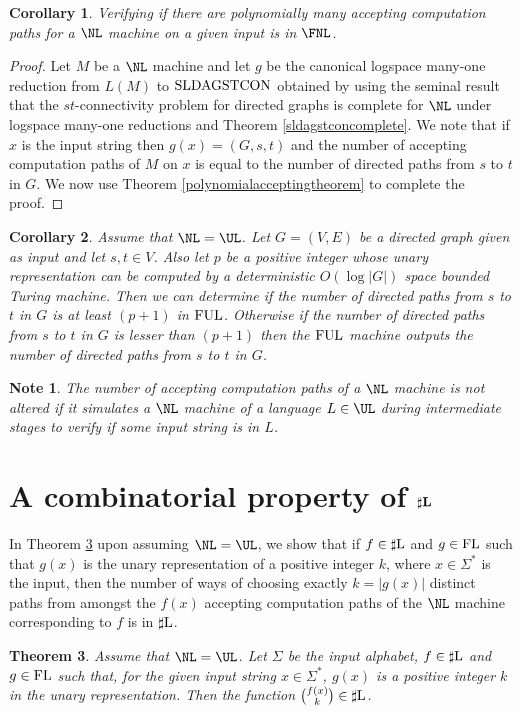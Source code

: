 \documentclass{amsbook}
\newtheorem{theorem}{Theorem}[chapter]
\newtheorem{corollary}[theorem]{Corollary}
\newtheorem{note}[notenum]{Note}
\theoremstyle{definition}
\theoremstyle{remark}
\numberwithin{section}{chapter}
\numberwithin{equation}{chapter}
\newcommand{\sharpL}{\mbox{$\sharp$\rm L}}
\newcommand{\boldsharpL}{\mbox{$\textrm{\bf $\mathbf{\sharp}$}$\rm \bf L}}
\newcommand{\FL}{\mbox{\rm FL}}
\newcommand{\LDAGSTCON}{\mbox{\rm SLDAGSTCON}}
\newcommand{\FUL}{\mbox{\rm FUL}}
\begin{document}
\begin{corollary}
Verifying if there are polynomially many accepting computation paths for a $\NL$ machine on a given input is in $\FNL$.
\end{corollary}
\begin{proof}
Let $M$ be a $\NL$ machine and let $g$ be the canonical logspace many-one reduction from $L(M)$ to $\LDAGSTCON$ obtained by using the seminal result that the $st$-connectivity problem for directed graphs is complete for $\NL$ under logspace many-one reductions and Theorem \ref{sldagstconcomplete}. We note that if $x$ is the input string then $g(x)=(G,s,t)$ and the number of accepting computation paths of $M$ on $x$ is equal to the number of directed paths from $s$ to $t$ in $G$. We now use Theorem \ref{polynomialacceptingtheorem} to complete the proof.
\end{proof}

\begin{corollary}\label{ldag-st-subgraph-ul}
Assume that $\NL =\UL$. Let $G=(V,E)$ be a directed graph given as input and let $s,t\in V$. Also let $p$ be a positive integer whose unary representation can be computed by a deterministic $O(\log |G|)$ space bounded Turing machine. Then we can determine if the number of directed paths from $s$ to $t$ in $G$ is at least $(p+1)$ in $\FUL$. Otherwise if the number of directed paths from $s$ to $t$ in $G$ is lesser than $(p+1)$ then the $\FUL$ machine outputs the number of directed paths from $s$ to $t$ in $G$.
\end{corollary}
\begin{note}\label{st-subgraph}
The number of accepting computation paths of a $\NL$ machine is not altered if it simulates a $\NL$ machine of a language $L\in \UL$ during intermediate stages to verify if some input string is in $L$.
\end{note}

\section{A combinatorial property of $\boldsharpL$}
In Theorem \ref{sharplchoosefl} upon assuming $\NL =\UL$, we show that if $f\in\sharpL$ and $g\in\FL$ such that $g(x)$ is the unary representation of a positive integer $k$, where $x\in\Sigma^{*}$ is the input, then the number of ways of choosing exactly $k=|g(x)|$ distinct paths from amongst the $f(x)$ accepting computation paths of the $\NL$ machine corresponding to $f$ is in $\sharpL$.
\begin{theorem}\label{sharplchoosefl}
  Assume that $\NL =\UL$. Let $\Sigma$ be the input alphabet, $f\in \sharpL$ and $g\in \FL$ such that, for the given input string $x\in\Sigma ^*$, $g(x)$ is a positive integer $k$ in the unary representation. Then the function
  ${{f(x)}\choose {k}}\in \sharpL$.
\end{theorem}
\end{document}
